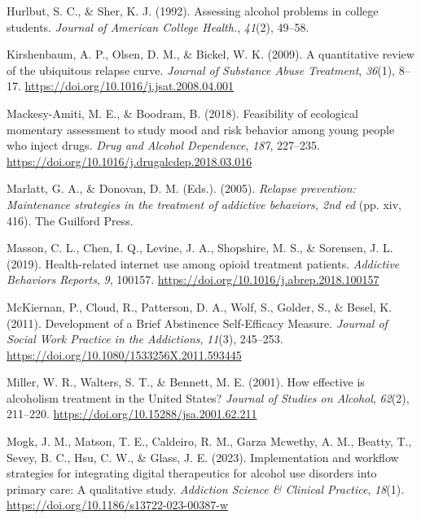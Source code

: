 \documentclass[
  letterpaper,
  DIV=11,
  numbers=noendperiod]{scrartcl}
\newlength{\cslhangindent}
\newenvironment{CSLReferences}[2] %
 {\begin{list}{}{%
  \setlength{\itemindent}{0pt}
  \setlength{\leftmargin}{0pt}
  \setlength{\parsep}{0pt}
  \ifodd #1
   \setlength{\leftmargin}{\cslhangindent}
   \setlength{\itemindent}{-1\cslhangindent}
  \fi
  \setlength{\itemsep}{#2\baselineskip}}}
 {\end{list}}
\begin{document}
\begin{CSLReferences}{1}{0}
Hurlbut, S. C., \& Sher, K. J. (1992). Assessing alcohol problems in
college students. \emph{Journal of American College Health.},
\emph{41}(2), 49--58.

Kirshenbaum, A. P., Olsen, D. M., \& Bickel, W. K. (2009). A
quantitative review of the ubiquitous relapse curve. \emph{Journal of
Substance Abuse Treatment}, \emph{36}(1), 8--17.
\url{https://doi.org/10.1016/j.jsat.2008.04.001}

Mackesy-Amiti, M. E., \& Boodram, B. (2018). Feasibility of ecological
momentary assessment to study mood and risk behavior among young people
who inject drugs. \emph{Drug and Alcohol Dependence}, \emph{187},
227--235. \url{https://doi.org/10.1016/j.drugalcdep.2018.03.016}

Marlatt, G. A., \& Donovan, D. M. (Eds.). (2005). \emph{Relapse
prevention: {Maintenance} strategies in the treatment of addictive
behaviors, 2nd ed} (pp. xiv, 416). The Guilford Press.

Masson, C. L., Chen, I. Q., Levine, J. A., Shopshire, M. S., \&
Sorensen, J. L. (2019). Health-related internet use among opioid
treatment patients. \emph{Addictive Behaviors Reports}, \emph{9},
100157. \url{https://doi.org/10.1016/j.abrep.2018.100157}

McKiernan, P., Cloud, R., Patterson, D. A., Wolf, S., Golder, S., \&
Besel, K. (2011). Development of a {Brief Abstinence Self-Efficacy
Measure}. \emph{Journal of Social Work Practice in the Addictions},
\emph{11}(3), 245--253.
\url{https://doi.org/10.1080/1533256X.2011.593445}

Miller, W. R., Walters, S. T., \& Bennett, M. E. (2001). How effective
is alcoholism treatment in the {United States}? \emph{Journal of Studies
on Alcohol}, \emph{62}(2), 211--220.
\url{https://doi.org/10.15288/jsa.2001.62.211}

Mogk, J. M., Matson, T. E., Caldeiro, R. M., Garza Mcwethy, A. M.,
Beatty, T., Sevey, B. C., Hsu, C. W., \& Glass, J. E. (2023).
Implementation and workflow strategies for integrating digital
therapeutics for alcohol use disorders into primary care: {A}
qualitative study. \emph{Addiction Science \& Clinical Practice},
\emph{18}(1). \url{https://doi.org/10.1186/s13722-023-00387-w}


\end{CSLReferences}
\end{document}
